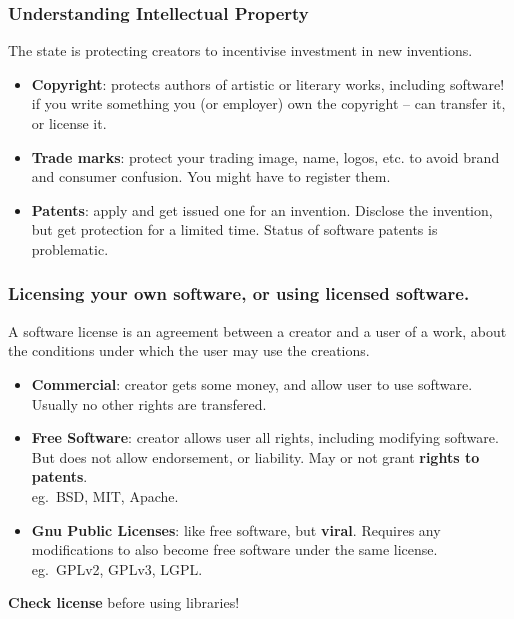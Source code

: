 \documentclass{beamer} %
\newcommand\emc[1]{\textcolor{brightblue}{\textbf{#1}}}
\begin{document}
\begin{frame}

\frametitle{Understanding Intellectual Property}

The state is protecting creators to incentivise investment in new inventions.
\begin{itemize}
  \item \emc{Copyright}: protects authors of artistic or literary works, including software! if you write something you (or employer) own the copyright -- can transfer it, or license it.
  \item \emc{Trade marks}: protect your trading image, name, logos, etc. to avoid brand and consumer confusion. You might have to register them.
  \item \emc{Patents}: apply and get issued one for an invention. Disclose the invention, but get protection for a limited time. Status of software patents is problematic.
\end{itemize}

\end{frame}

\begin{frame}

\frametitle{Licensing your own software, or using licensed software.}

A software license is an agreement between a creator and a user of a work, about the conditions under which the user may use the creations. 

\begin{itemize}
  \item \emc{Commercial}: creator gets some money, and allow user to use software. Usually no other rights are transfered.
  \item \emc{Free Software}: creator allows user all rights, including modifying software. But does not allow endorsement, or liability. May or not grant \emc{rights to patents}. \\
  eg.\ BSD, MIT, Apache.
  \item \emc{Gnu Public Licenses}: like free software, but \emc{viral}. Requires any modifications to also become free software under the same license. \\ eg.\ GPLv2, GPLv3, LGPL.
\end{itemize}

\emc{Check license} before using libraries!

\end{frame}
\end{document}
